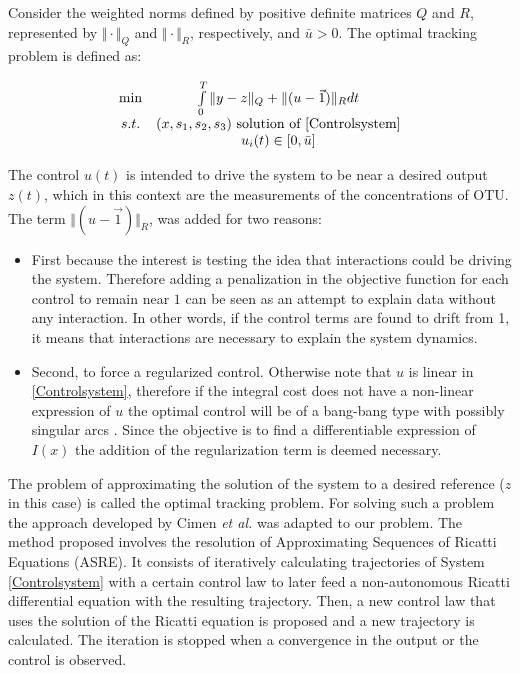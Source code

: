 \documentclass[processes,article,submit,moreauthors,pdftex]{Definitions/mdpi}
\begin{document}
Consider the weighted norms defined by positive definite matrices $Q$ and $R$, represented by $\Vert \cdot \Vert_Q$ and $\Vert \cdot \Vert_R$, respectively, and $\bar{u}>0$. The optimal tracking problem is defined as: 

\begin{align}
\label{Optimal Control} \begin{array}{cc} \min &  \int \limits_{0}^{T} \Vert y - z \Vert_Q + \Vert(u -\vec{1}) \Vert_R dt\\
s.t.& 
(x,s_1,s_2,s_3)\mbox{ solution of \eqref{Controlsystem}} \\
&u_i(t) \in [0,\bar{u}]
\end{array}	
\end{align} 

The control $u(t)$ is intended to drive the system to be near a desired output $z(t)$, which in this context are the measurements of the concentrations of OTU. The term $\Vert(u -\vec{1}) \Vert_R$, was added for two reasons:
\begin{itemize}
	\item First because the interest is testing the idea that interactions could be driving the system. Therefore adding a penalization in the objective function for each control to remain near $1$ can be seen as an attempt to explain data without any interaction. In other words, if the control terms are found to drift from 1, it means that interactions are necessary to explain the system dynamics.
	
	\item Second, to force a regularized control. Otherwise note that $u$ is linear in \eqref{Controlsystem}, therefore if the integral cost does not have a non-linear expression of $u$ the optimal control will be of a bang-bang type with possibly singular arcs \cite{harmand2019optimal}. Since the objective is to find a differentiable expression of $I(x)$ the addition of the regularization term is deemed necessary.
\end{itemize} 
The problem of approximating the solution of the system to a desired reference ($z$ in this case) is called the optimal tracking problem. For solving such a problem the approach developed by Cimen \textit{et al.} \cite{Cimen2004, Cimen2008} was adapted to our problem. The method proposed involves the resolution of Approximating Sequences of Ricatti Equations (ASRE). It consists of iteratively calculating trajectories of System \eqref{Controlsystem} with a certain control law to later feed a non-autonomous Ricatti differential equation with the resulting trajectory. Then, a new control law that uses the solution of the Ricatti equation is proposed and a new trajectory is calculated. The iteration is stopped when a convergence in the output or  the control is observed.
\end{document}
